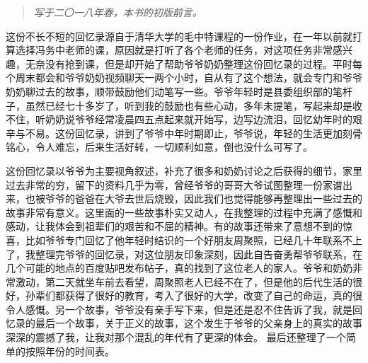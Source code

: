 \begin{quote}\textit{写于二〇一八年春，本书的初版前言。}\end{quote}
这份不长不短的回忆录源自于清华大学的毛中特课程的一份作业，在一年以前就打算选择冯务中老师的课，原因就是打听了各个老师的任务，对这项任务非常感兴趣，无奈没有抢到课，但是却开始了帮助爷爷奶奶整理这份回忆录的过程。平时每个周末都会和爷爷奶奶视频聊天一两个小时，自从有了这个想法，就会专门和爷爷奶奶聊过去的故事，顺带鼓励他们动笔写一些。爷爷年轻时是县委组织部的笔杆子，虽然已经七十多岁了，听到我的鼓励也有些心动，多年未提笔，写起来却是收不住，听奶奶说爷爷经常凌晨四五点起来就开始写，边写边流泪，回忆幼年时的艰辛与不易。这份回忆录，讲到了爷爷中年时期即止，爷爷说，年轻的生活更加刻骨铭心，令人难忘，后来生活好转，一切顺利如意，倒也没什么可写了。

这份回忆录以爷爷为主要视角叙述，补充了很多和奶奶讨论之后获得的细节，家里过去非常的穷，留下的资料几乎为零，曾经爷爷的哥哥大爷试图整理一份家谱出来，也被爷爷的爸爸在大爷去世后烧毁，因此我们也觉得能够再整理出一些过去的故事非常有意义。这里面的一些故事朴实又动人，在我整理的过程中充满了感慨和感动，让我体会到祖辈们的艰苦和不屈的精神。有的故事还带来了意想不到的惊喜，比如爷爷专门回忆了他年轻时结识的一个好朋友周聚照，已经几十年联系不上了，我整理完爷爷的回忆录，对这位朋友印象深刻，因此自告奋勇帮爷爷联系，在几个可能的地点的百度贴吧发布帖子，真的找到了这位老人的家人。爷爷和奶奶非常激动，第二天就坐车前去看望，周聚照老人已经不在了，但是他的后代生活的很好，孙辈们都获得了很好的教育，考入了很好的大学，改变了自己的命运，真的很令人感慨。另一个故事，爷爷没有亲手写下来，但是还是忍不住告诉了我，就是回忆录的最后一个故事，关于正义的故事，这个发生于爷爷的父亲身上的真实的故事深深的震撼了我，让我对那个混乱的年代有了更深的体会。 最后还整理了一个简单的按照年份的时间表。
